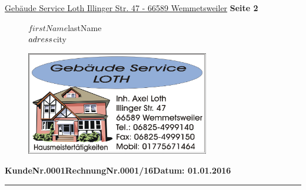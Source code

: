 \documentclass[11pt]{scrartcl}
\begin{document}
\begin{scriptsize}
\underline{Gebäude Service Loth Illinger Str. 47 - 66589 Wemmetsweiler} \hfill \textbf{Seite 2}
\end{scriptsize}

\onehalfspacing

\begin{figure}[h]
\begin{minipage}{9cm}
$firstName $lastName\\
$adress \bigskip \\
$city\\
\end{minipage}
\begin{minipage}{8cm}
\includegraphics [width=8cm]{logo.png}
\end{minipage}
\end{figure}

\singlespacing

\bigskip


\begin{flushright}

\textbf{Kunde\hspace{1cm}Nr.\hspace{1cm}0001\hspace{1cm}Rechnung\hspace{1cm}Nr.\hspace{1cm}0001/16\hfill Datum: 01.01.2016\\}
{\hrule height 2pt}

\end{flushright}

\bigskip

\renewcommand{\arraystretch}{2}


\end{document}
